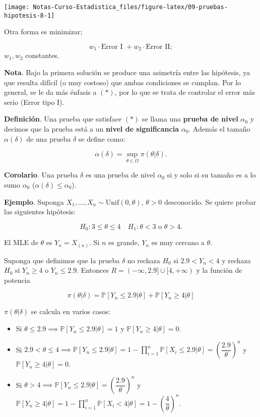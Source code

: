 \documentclass[
  12pt,
]{book}
\begin{document}
\begin{center}\texttt{[image: Notas-Curso-Estadistica\_files/figure-latex/09-pruebas-hipotesis-8-1]} \end{center}

Otra forma es minimizar;

\[w_1\cdot\text{Error I } + w_2\cdot\text{Error II};\]
\(w_1,w_2\) constantes.

\textbf{Nota}. Bajo la primera solución se produce una asimetría entre las hipótesis,
ya que resulta difícil (o muy costoso) que ambas condiciones se cumplan. Por lo
general, se le da más énfasis a \((*)\), por lo que se trata de controlar el error
más serio (Error tipo I).

\textbf{Definición}. Una prueba que satisface \((*)\) se llama una \textbf{prueba de nivel}
\(\alpha_0\) y decimos que la prueba está a un \textbf{nivel de significancia}
\(\alpha_0\). Además el tamaño \(\alpha(\delta)\) de una prueba \(\delta\) se define
como:

\[\alpha(\delta) = \sup_{\theta\in\Omega}\pi(\theta|\delta).\]

\textbf{Corolario}. Una prueba \(\delta\) es una prueba de nivel \(\alpha_0\) si y solo
si su tamaño es a lo sumo \(\alpha_0\) (\(\alpha(\delta)\leq\alpha_0\)).

\textbf{Ejemplo}. Suponga \(X_1,\dots,X_n\sim \text{Unif}(0,\theta)\), \(\theta>0\)
desconocido. Se quiere probar las siguientes hipótesis:

\[H_0: 3\leq\theta\leq 4 \quad H_1:\theta<3 \text{ o }\theta>4. \]

El MLE de \(\theta\) es \(Y_n = X_{(n)}\). Si \(n\) es grande, \(Y_n\) es muy cercano a
\(\theta\).

Suponga que definimos que la prueba \(\delta\) no rechaza \(H_0\) si \(2.9<Y_n<4\) y
rechaza \(H_0\) si \(Y_n\geq4\) o \(Y_n\leq2.9\). Entonces \(R = (-\infty, 2.9] \cup [4,+\infty)\) y la función de potencia

\[
\pi(\theta|\delta) = \mathbb P[Y_n\leq
2.9|\theta]+\mathbb P[Y_n\geq4|\theta] 
\]

\(\pi(\theta|\delta)\) se calcula en varios casos:

\begin{itemize}
\item
  Si \(\theta\leq 2.9 \implies \mathbb P[Y_n\leq 2.9|\theta] = 1\) y
  \(\mathbb P[Y_n\geq4|\theta] = 0\).
\item
  Si \(2.9<\theta\leq4 \implies \mathbb P[Y_n\leq 2.9|\theta] = 1 - \prod_{i=1}^n \mathbb P[X_i\leq2.9|\theta] = \left(\dfrac{2.9}{\theta}\right)^n\) y \(\mathbb P[Y_n\geq4|\theta] = 0\).
\item
  Si \(\theta>4 \implies \mathbb P[Y_n\leq 2.9|\theta] = \left(\dfrac{2.9}{\theta}\right)^n\) y \(\mathbb P[Y_n\geq 4|\theta] = 1 - \displaystyle\prod_{i=1}^n \mathbb P[X_i<4|\theta] = 1-\left(\dfrac 4\theta\right)^n\).
\end{itemize}
\end{document}
